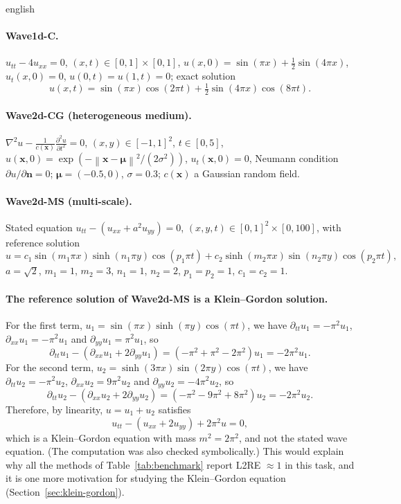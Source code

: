 \documentclass[12pt,letterpaper,twoside]{book}
\newcommand{\norm}[1]{\left\lVert #1 \right\rVert}
\begin{document}
\begin{hyphenrules}{english}
\paragraph{Wave1d-C.} $u_{tt}-4u_{xx}=0$, $(x,t)\in[0,1]\times[0,1]$,
$u(x,0)=\sin(\pi x)+\frac12\sin(4\pi x)$, $u_t(x,0)=0$, $u(0,t)=u(1,t)=0$; exact solution
\[
  u(x,t)=\sin(\pi x)\cos(2\pi t)+\tfrac12\sin(4\pi x)\cos(8\pi t).
\]

\paragraph{Wave2d-CG (heterogeneous medium).} $\nabla^2u-\frac{1}{c(\mathbf{x})}\frac{\partial^2u}{\partial t^2}=0$,
$(x,y)\in[-1,1]^2$, $t\in[0,5]$, $u(\mathbf{x},0)=\exp(-\norm{\mathbf{x}-\bm\mu}^2/(2\sigma^2))$, $u_t(\mathbf{x},0)=0$, Neumann
condition $\partial u/\partial\mathbf{n}=0$; $\bm\mu=(-0.5,0)$, $\sigma=0.3$; $c(\mathbf{x})$ a Gaussian random field.

\paragraph{Wave2d-MS (multi-scale).} Stated equation $u_{tt}-(u_{xx}+a^2u_{yy})=0$,
$(x,y,t)\in[0,1]^2\times[0,100]$, with reference solution
\[
  u=c_1\sin(m_1\pi x)\sinh(n_1\pi y)\cos(p_1\pi t)+c_2\sinh(m_2\pi x)\sin(n_2\pi y)\cos(p_2\pi t),
\]
$a=\sqrt2$, $m_1=1$, $m_2=3$, $n_1=1$, $n_2=2$, $p_1=p_2=1$, $c_1=c_2=1$.

\paragraph{The reference solution of Wave2d-MS is a Klein--Gordon solution.}
For the first term, $u_1=\sin(\pi x)\sinh(\pi y)\cos(\pi t)$, we have $\partial_{tt}u_1=-\pi^2u_1$,
$\partial_{xx}u_1=-\pi^2u_1$ and $\partial_{yy}u_1=\pi^2u_1$, so
\[
  \partial_{tt}u_1-(\partial_{xx}u_1+2\partial_{yy}u_1)=(-\pi^2+\pi^2-2\pi^2)u_1=-2\pi^2u_1.
\]
For the second term, $u_2=\sinh(3\pi x)\sin(2\pi y)\cos(\pi t)$, we have $\partial_{tt}u_2=-\pi^2u_2$,
$\partial_{xx}u_2=9\pi^2u_2$ and $\partial_{yy}u_2=-4\pi^2u_2$, so
\[
  \partial_{tt}u_2-(\partial_{xx}u_2+2\partial_{yy}u_2)=(-\pi^2-9\pi^2+8\pi^2)u_2=-2\pi^2u_2.
\]
Therefore, by linearity, $u=u_1+u_2$ satisfies
\begin{equation}
  u_{tt}-(u_{xx}+2u_{yy})+2\pi^2u=0,
  \label{eq:wave2dms-kg}
\end{equation}
which is a Klein--Gordon equation with mass $m^2=2\pi^2$, and not the stated wave equation. (The
computation was also checked symbolically.) This would explain why all the methods of
Table~\ref{tab:benchmark} report L2RE $\approx1$ in this task, and it is one more motivation for studying the
Klein--Gordon equation (Section~\ref{sec:klein-gordon}).


\end{hyphenrules}
\end{document}

